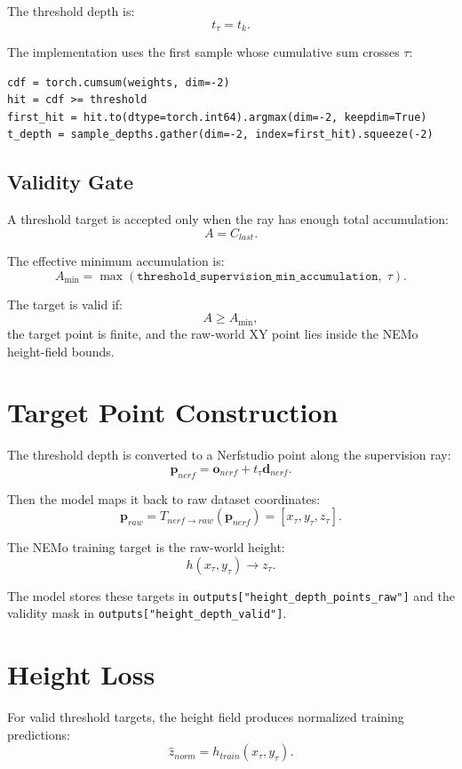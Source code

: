 \documentclass[11pt]{article}
\begin{document}
The threshold depth is:
\[
  t_{\tau} = t_k.
\]

The implementation uses the first sample whose cumulative sum crosses \(\tau\):

\begin{lstlisting}
cdf = torch.cumsum(weights, dim=-2)
hit = cdf >= threshold
first_hit = hit.to(dtype=torch.int64).argmax(dim=-2, keepdim=True)
t_depth = sample_depths.gather(dim=-2, index=first_hit).squeeze(-2)
\end{lstlisting}

\subsection{Validity Gate}

A threshold target is accepted only when the ray has enough total accumulation:
\[
  A = C_{last}.
\]

The effective minimum accumulation is:
\[
  A_{\min} =
  \max(\texttt{threshold\_supervision\_min\_accumulation},\;\tau).
\]

The target is valid if:
\[
  A \ge A_{\min},
\]
the target point is finite, and the raw-world XY point lies inside the NEMo height-field bounds.

\section{Target Point Construction}

The threshold depth is converted to a Nerfstudio point along the supervision ray:
\[
  \mathbf{p}_{nerf} = \mathbf{o}_{nerf} + t_{\tau}\mathbf{d}_{nerf}.
\]

Then the model maps it back to raw dataset coordinates:
\[
  \mathbf{p}_{raw} = T_{nerf\rightarrow raw}(\mathbf{p}_{nerf})
  =
  [x_{\tau},y_{\tau},z_{\tau}].
\]

The NEMo training target is the raw-world height:
\[
  h(x_{\tau},y_{\tau}) \rightarrow z_{\tau}.
\]

The model stores these targets in \texttt{outputs["height\_depth\_points\_raw"]} and the validity mask in \texttt{outputs["height\_depth\_valid"]}.

\section{Height Loss}

For valid threshold targets, the height field produces normalized training predictions:
\[
  \hat{z}_{norm} = h_{train}(x_{\tau},y_{\tau}).
\]
\end{document}
